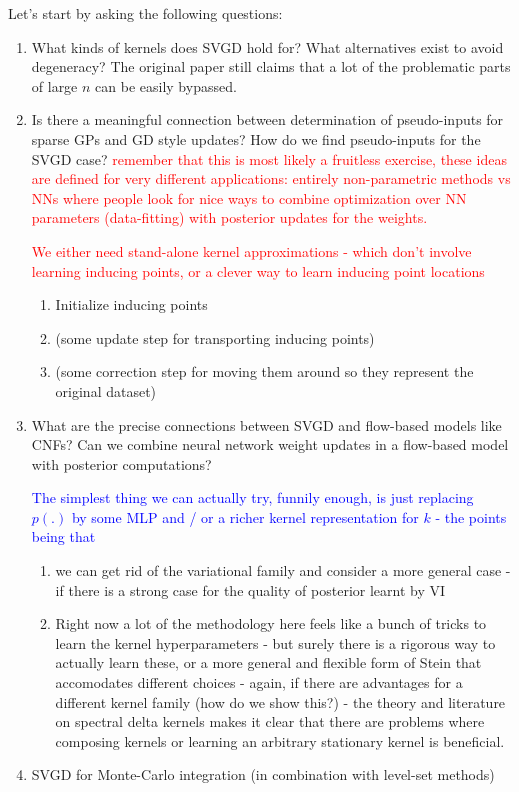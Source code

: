 \documentclass[12pt]{article}
\renewcommand{\[}{\left[}
\renewcommand{\]}{\right]}
\renewcommand{\(}{\left(}
\renewcommand{\)}{\right)}
\begin{document}
Let's start by asking the following questions:
\begin{enumerate}
    \item What kinds of kernels does SVGD hold for? What alternatives exist to avoid degeneracy? The original paper still claims that a lot of the problematic parts of large $n$ can be easily bypassed.

    \item Is there a meaningful connection between determination of pseudo-inputs for sparse GPs and GD style updates? How do we find pseudo-inputs for the SVGD case? \textcolor{red}{remember that this is most likely a fruitless exercise, these ideas are defined for very different applications: entirely non-parametric methods vs NNs where people look for nice ways to combine optimization over NN parameters (data-fitting) with posterior updates for the weights.}

    \textcolor{red}{We either need stand-alone kernel approximations - which don't involve learning inducing points, or a clever way to learn inducing point locations}

    \begin{enumerate}
        \item Initialize inducing points

        \item (some update step for transporting inducing points)

        \item (some correction step for moving them around so they represent the original dataset)
    \end{enumerate}

    \item What are the precise connections between SVGD and flow-based models like CNFs? Can we combine neural network weight updates in a flow-based model with posterior computations?

    \textcolor{blue}{The simplest thing we can actually try, funnily enough, is just replacing $p(.)$ by some MLP and / or a richer kernel representation for $k$ - the points being that}
    
    \begin{enumerate}
        \item we can get rid of the variational family and consider a more general case - if there is a strong case for the quality of posterior learnt by VI

        \item Right now a lot of the methodology here feels like a bunch of tricks to learn the kernel hyperparameters - but surely there is a rigorous way to actually learn these, or a more general and flexible form of Stein that accomodates different choices - again, if there are advantages for a different kernel family (how do we show this?) - the theory and literature on spectral delta kernels makes it clear that there are problems where composing kernels or learning an arbitrary stationary kernel is beneficial. 
    \end{enumerate}

    \item SVGD for Monte-Carlo integration (in combination with level-set methods)
\end{enumerate}
\end{document}
